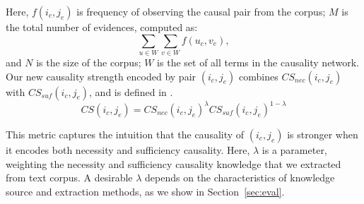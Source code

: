 Here, $f(i_c,j_e)$ is frequency of observing the causal pair
from the corpus; $M$ is the total number of evidences, computed as:
$$\sum_{u\in W} \sum_{v\in W} f(u_c,v_e),$$ 
and $N$ is the size of the corpus;
$W$ is the set of all terms in the causality network.
Our new causality strength encoded by pair $(i_c,j_e)$ combines
$CS_{nec}(i_c,j_e)$ with $CS_{suf}(i_c,j_e)$,
and is defined in .
\begin{equation}
CS(i_c,j_e) = CS_{nec}(i_c,j_e)^{\lambda} CS_{suf}(i_c,j_e)^{1-\lambda} 
\label{eq:weightedcs}
\end{equation}

This metric captures the intuition that the causality of $(i_c,j_e)$ 
is stronger when it encodes both necessity and sufficiency causality.
Here, $\lambda$ is a parameter, weighting the necessity and sufficiency causality
knowledge that we extracted from text corpus.
A desirable $\lambda$ depends on
the characteristics of knowledge source and extraction methods, as we
show in Section~\ref{sec:eval}.






